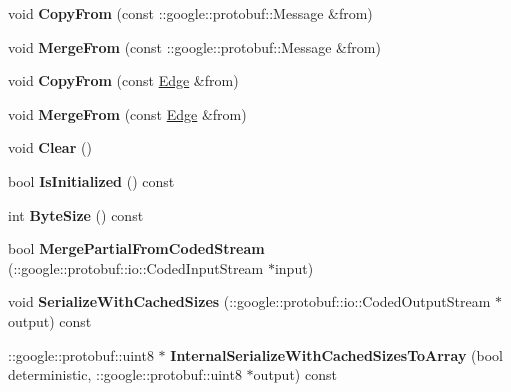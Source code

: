 \begin{DoxyCompactItemize}
void {\bfseries Copy\+From} (const \+::google\+::protobuf\+::\+Message \&from)
\item 
\hypertarget{classstruct_definitions_1_1_edge_a7d5e727a328ecb7d147c20aaf4f38dfa}{}\label{classstruct_definitions_1_1_edge_a7d5e727a328ecb7d147c20aaf4f38dfa} 
void {\bfseries Merge\+From} (const \+::google\+::protobuf\+::\+Message \&from)
\item 
\hypertarget{classstruct_definitions_1_1_edge_af25be753dbaf05c0f4c2d84be76290f1}{}\label{classstruct_definitions_1_1_edge_af25be753dbaf05c0f4c2d84be76290f1} 
void {\bfseries Copy\+From} (const \hyperlink{classstruct_definitions_1_1_edge}{Edge} \&from)
\item 
\hypertarget{classstruct_definitions_1_1_edge_ad455113962cdf3f366203624e01e9b92}{}\label{classstruct_definitions_1_1_edge_ad455113962cdf3f366203624e01e9b92} 
void {\bfseries Merge\+From} (const \hyperlink{classstruct_definitions_1_1_edge}{Edge} \&from)
\item 
\hypertarget{classstruct_definitions_1_1_edge_a06cd9f35db685fdce3c2a8aaff4f135d}{}\label{classstruct_definitions_1_1_edge_a06cd9f35db685fdce3c2a8aaff4f135d} 
void {\bfseries Clear} ()
\item 
\hypertarget{classstruct_definitions_1_1_edge_a82cf301eabe8eece28fd2b3bb61ad9fd}{}\label{classstruct_definitions_1_1_edge_a82cf301eabe8eece28fd2b3bb61ad9fd} 
bool {\bfseries Is\+Initialized} () const
\item 
\hypertarget{classstruct_definitions_1_1_edge_aa4a707cbb4b7c088f83e7fe3b5e9d394}{}\label{classstruct_definitions_1_1_edge_aa4a707cbb4b7c088f83e7fe3b5e9d394} 
int {\bfseries Byte\+Size} () const
\item 
\hypertarget{classstruct_definitions_1_1_edge_ab4a6d0b694ae0269b613b221cffacdf1}{}\label{classstruct_definitions_1_1_edge_ab4a6d0b694ae0269b613b221cffacdf1} 
bool {\bfseries Merge\+Partial\+From\+Coded\+Stream} (\+::google\+::protobuf\+::io\+::\+Coded\+Input\+Stream $\ast$input)
\item 
\hypertarget{classstruct_definitions_1_1_edge_a26d3dca7d23bd21b8d53fd16875a8864}{}\label{classstruct_definitions_1_1_edge_a26d3dca7d23bd21b8d53fd16875a8864} 
void {\bfseries Serialize\+With\+Cached\+Sizes} (\+::google\+::protobuf\+::io\+::\+Coded\+Output\+Stream $\ast$output) const
\item 
\hypertarget{classstruct_definitions_1_1_edge_ac927a08de5a5c4cfc666d5630c43180b}{}\label{classstruct_definitions_1_1_edge_ac927a08de5a5c4cfc666d5630c43180b} 
\+::google\+::protobuf\+::uint8 $\ast$ {\bfseries Internal\+Serialize\+With\+Cached\+Sizes\+To\+Array} (bool deterministic, \+::google\+::protobuf\+::uint8 $\ast$output) const

\end{DoxyCompactItemize}
